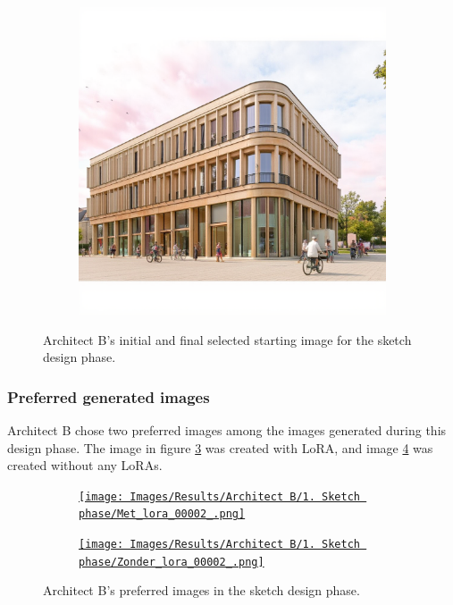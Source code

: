 \begin{figure}[H]
\begin{subfigure}[b]{0.3\textwidth}
        \href{https://github.com/matijspeeters/Thesis/blob/main/Images/Results/Architect-B_Fixed-images/1-sketch_design/Met_lora_00026_.png}{\includegraphics[width=\textwidth]{Images/Results/Architect-B_Fixed-images/1-sketch_design/Met_lora_00026_.png}}
        \caption{}
        \label{fig:B-sketch-selected-b}
    \end{subfigure}
    \caption{Architect B's initial and final selected starting image for the sketch design phase.}
    \label{fig:B-sketch-selected}
\end{figure}
\subsubsection{Preferred generated images}
Architect B chose two preferred images among the images generated during this design phase. The image in figure \ref{B-sketch-preferred-a} was created with LoRA, and image \ref{B-sketch-preferred-b} was created without any LoRAs.
\begin{figure}[H]
    \centering
    \begin{subfigure}[b]{0.3\textwidth}
        \centering
        \href{https://github.com/matijspeeters/Thesis/blob/main/Images/Results/Architect%20B/1.%20Sketch%20phase/Met_lora_00002_.png}{\texttt{[image: Images/Results/Architect B/1. Sketch phase/Met\_lora\_00002\_.png]}}
        \caption{}
        \label{B-sketch-preferred-a}
    \end{subfigure}
    \begin{subfigure}[b]{0.3\textwidth}
        \centering
        \href{https://github.com/matijspeeters/Thesis/blob/main/Images/Results/Architect%20B/1.%20Sketch%20phase/Zonder_lora_00002_.png}{\texttt{[image: Images/Results/Architect B/1. Sketch phase/Zonder\_lora\_00002\_.png]}}
        \caption{}
        \label{B-sketch-preferred-b}
    \end{subfigure}
    \caption{Architect B's preferred images in the sketch design phase.}
    \label{fig:B-sketch-preferred}
\end{figure}
